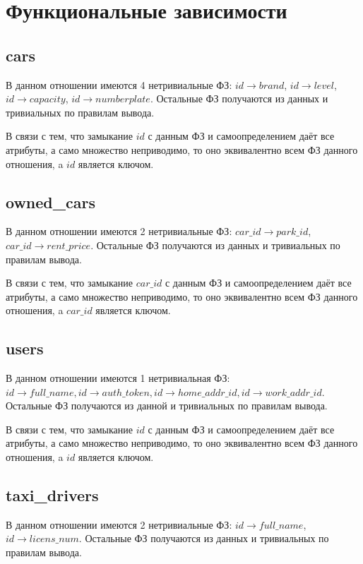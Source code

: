 \documentclass[fontsize=12pt]{article}
\begin{document}
\section{Функциональные зависимости}

\subsection{cars}

В данном отношении имеются 4 нетривиальные ФЗ: $id \rightarrow brand$, $id \rightarrow level$, $id \rightarrow capacity$, $id \rightarrow numberplate$. Остальные ФЗ получаются из данных и тривиальных по правилам вывода. 

В связи с тем, что замыкание $id$ с данным ФЗ и самоопределением даёт все атрибуты, а само множество неприводимо, то оно эквивалентно всем ФЗ данного отношения, a $id$ является ключом.

\subsection{owned\_cars}

В данном отношении имеются 2 нетривиальные ФЗ: $car\_id \rightarrow park\_id$, $car\_id \rightarrow rent\_price$. Остальные ФЗ получаются из данных и тривиальных по правилам вывода. 

В связи с тем, что замыкание $car\_id$ с данным ФЗ и самоопределением даёт все атрибуты, а само множество неприводимо, то оно эквивалентно всем ФЗ данного отношения, a $car\_id$ является ключом.

\subsection{users}

В данном отношении имеются 1 нетривиальная ФЗ: $id \rightarrow full\_name, id \rightarrow auth\_token, id \rightarrow home\_addr\_id, id \rightarrow work\_addr\_id$. Остальные ФЗ получаются из данной и тривиальных по правилам вывода. 

В связи с тем, что замыкание $id$ с данным ФЗ и самоопределением даёт все атрибуты, а само множество неприводимо, то оно эквивалентно всем ФЗ данного отношения, a $id$ является ключом.

\subsection{taxi\_drivers}

В данном отношении имеются 2 нетривиальные ФЗ: $id \rightarrow full\_name$, $id \rightarrow licens\_num$. Остальные ФЗ получаются из данных и тривиальных по правилам вывода. 
\end{document}
